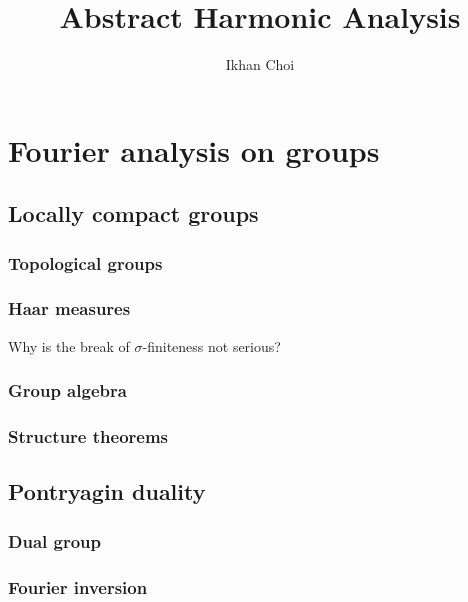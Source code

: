 \documentclass{../note}
\begin{document}
\title{Abstract Harmonic Analysis}
\author{Ikhan Choi}
\maketitle
\tableofcontents



\part{Fourier analysis on groups}
\chapter{Locally compact groups}
\section{Topological groups}
\section{Haar measures}
\begin{prb}
\end{prb}
Why is the break of $\sigma$-finiteness not serious?
\section{Group algebra}
\begin{prb}
\end{prb}
\begin{prb}[Convolution]
\end{prb}
\section{Structure theorems}


\chapter{Pontryagin duality}
\section{Dual group}
\section{}
\section{Fourier inversion}
\begin{prb}
\end{prb}
\begin{prb}
\end{prb}
\begin{prb}
\end{prb}
\begin{prb}
\end{prb}
\end{document}
